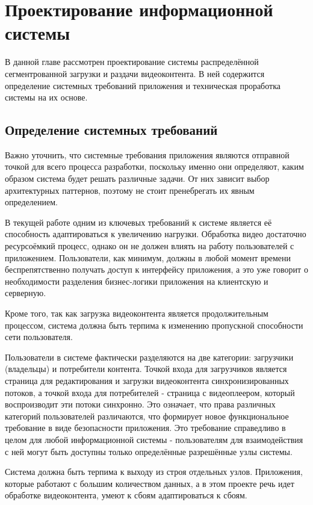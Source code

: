 \chapter{Проектирование информационной системы} \label{ch2}
	
В данной главе рассмотрен проектирование системы распределённой сегментрованной загрузки и раздачи видеоконтента. В ней содержится определение системных требований приложения и техническая проработка системы на их основе.

\section{Определение системных требований} \label{ch2:system_requirements}

	Важно уточнить, что системные требования приложения являются отправной точкой для всего процесса разработки, поскольку именно они определяют, каким образом система будет решать различные задачи. От них зависит выбор архитектурных паттернов, поэтому не стоит пренебрегать их явным определением.
	
	В текущей работе одним из ключевых требований к системе является её способность адаптироваться к увеличению нагрузки. Обработка видео достаточно ресурсоёмкий процесс, однако он не должен влиять на работу пользователей с приложением. Пользователи, как минимум, должны в любой момент времени беспрепятственно получать доступ к интерфейсу приложения, а это уже говорит о необходимости разделения бизнес-логики приложения на клиентскую и серверную.
	
	Кроме того, так как загрузка видеоконтента является продолжительным процессом, система должна быть терпима к изменению пропускной способности сети пользователя.
	
	Пользователи в системе фактически разделяются на две категории: загрузчики (владельцы) и потребители контента. Точкой входа для загрузчиков является страница для редактирования и загрузки видеоконтента синхронизированных потоков, а точкой входа для потребителей - страница с видеоплеером, который воспроизводит эти потоки синхронно. Это означает, что права различных категорий пользователей различаются, что формирует новое функциональное требование в виде безопасности приложения. Это требование справедливо в целом для любой информационной системы - пользователям для взаимодействия с ней могут быть доступны только определённые разрешённые узлы системы.
	
	Система должна быть терпима к выходу из строя отдельных узлов. Приложения, которые работают с большим количеством данных, а в этом проекте речь идет обработке видеоконтента, умеют к сбоям адаптироваться к сбоям.
	
